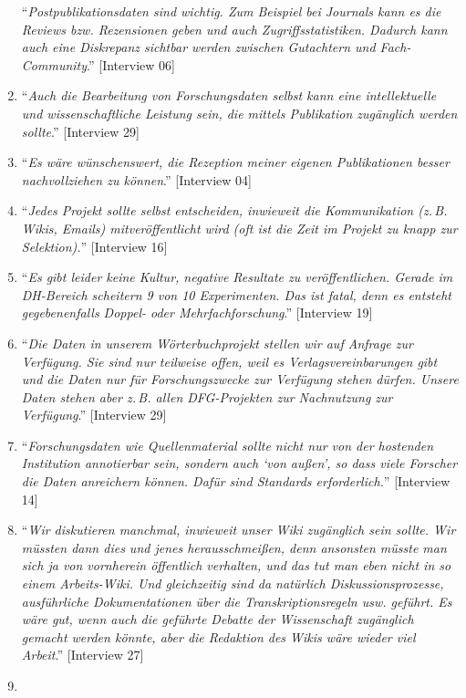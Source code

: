 \documentclass[a4paper,
fontsize=11pt,
oneside,
numbers=noperiodatend,
parskip=half-,
bibliography=totoc,
final
]{scrartcl}
\begin{document}
\begin{enumerate}
  \enquote{\emph{Postpublikationsdaten sind wichtig. Zum Beispiel bei
  Journals kann es die Reviews bzw. Rezensionen geben und auch
  Zugriffsstatistiken. Dadurch kann auch eine Diskrepanz sichtbar werden
  zwischen Gutachtern und Fach-Community}.} {[}Interview 06{]}
\item
  \enquote{\emph{Auch die Bearbeitung von Forschungsdaten selbst kann
  eine intellektuelle und wissenschaftliche Leistung sein, die mittels
  Publikation zugänglich werden sollte}.} {[}Interview 29{]}
\item
  \enquote{\emph{Es wäre wünschenswert, die Rezeption meiner eigenen
  Publikationen besser nachvollziehen zu können}.} {[}Interview 04{]}
\item
  \enquote{\emph{Jedes Projekt sollte selbst entscheiden, inwieweit die
  Kommunikation (z.\,B. Wikis, Emails) mitveröffentlicht wird (oft ist die
  Zeit im Projekt zu knapp zur Selektion).}} {[}Interview 16{]}
\item
  \enquote{\emph{Es gibt leider keine Kultur, negative Resultate zu
  veröffentlichen. Gerade im DH-Bereich scheitern 9 von 10 Experimenten.
  Das ist fatal, denn es entsteht gegebenenfalls Doppel- oder
  Mehrfachforschung}.} {[}Interview 19{]}
\item
  \enquote{\emph{Die Daten in unserem Wörterbuchprojekt stellen wir auf
  Anfrage zur Verfügung. Sie sind nur teilweise offen, weil es
  Verlagsvereinbarungen gibt und die Daten nur für Forschungszwecke zur
  Verfügung stehen dürfen. Unsere Daten stehen aber z.\,B. allen
  DFG-Projekten zur Nachnutzung zur Verfügung}.} {[}Interview 29{]}
\item
  \enquote{\emph{Forschungsdaten wie Quellenmaterial sollte nicht nur
  von der hostenden Institution annotierbar sein, sondern auch
  \enquote{von außen}, so dass viele Forscher die Daten anreichern
  können. Dafür sind Standards erforderlich.}} {[}Interview 14{]}
\item
  \enquote{\emph{Wir diskutieren manchmal, inwieweit unser Wiki
  zugänglich sein sollte. Wir müssten dann dies und jenes
  herausschmeißen, denn ansonsten müsste man sich ja von vornherein
  öffentlich verhalten, und das tut man eben nicht in so einem
  Arbeits-Wiki. Und gleichzeitig sind da natürlich Diskussionsprozesse,
  ausführliche Dokumentationen über die Transkriptionsregeln usw.
  geführt. Es wäre gut, wenn auch die geführte Debatte der Wissenschaft
  zugänglich gemacht werden könnte, aber die Redaktion des Wikis wäre
  wieder viel Arbeit}.} {[}Interview 27{]}
\item

\end{enumerate}
\end{document}

